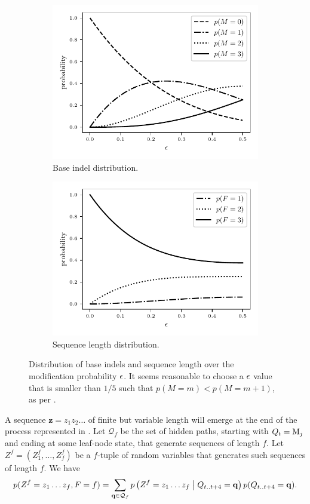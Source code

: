 \begin{figure}[htbp]
  \centering
  \captionsetup{width=0.85\linewidth}
  \begin{subfigure}{.5\linewidth}
    \centering
    \includegraphics[width=.7\linewidth]{figure/indel-prob}
    \caption{Base indel distribution.}\label{fig:indel-dist}
  \end{subfigure}%
  \begin{subfigure}{.5\linewidth}
    \centering
    \includegraphics[width=.7\linewidth]{figure/seq-len-prob}
    \caption{Sequence length distribution.}\label{fig:len-dist}
  \end{subfigure}
  \caption{ Distribution of base indels and sequence length over the modification probability
  $\epsilon$. It seems reasonable to choose a $\epsilon$ value that is smaller than $1/5$ such that
  $p(M=m)<p(M=m+1)$, as per . }\label{fig:dist}
\end{figure}

A sequence $\mathbf z=z_1 z_2\dots$ of finite but variable length will emerge at the end of the
process represented in .
Let $\mathcal Q_f$ be the set of hidden paths, starting with $Q_t=\mathrm{M}_j$ and ending at some leaf-node state,
that generate sequences of length $f$.
Let $Z^f=(Z^f_1, \dots, Z^f_f)$ be a $f$-tuple of random variables that generates such sequences of length $f$.
We have
\begin{equation*}
  p(Z^f=z_1\dots z_f,F=f) = \sum_{\mathbf q \in \mathcal Q_f}
  p\left(Z^f=z_1\dots z_f\;\middle|\; Q_{t..t+4}=\mathbf q\right) p(Q_{t..t+4}=\mathbf q).
\end{equation*}
